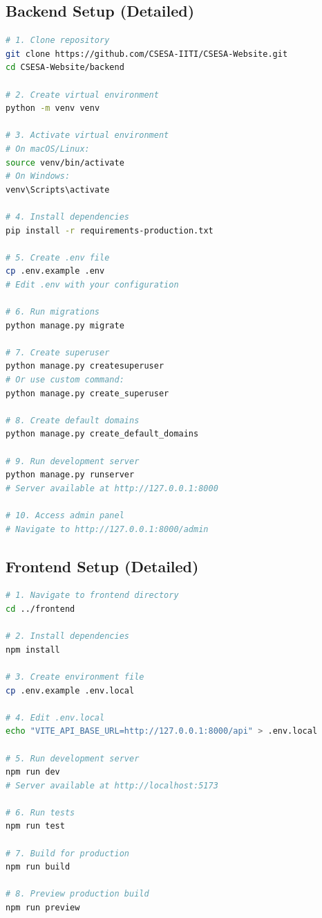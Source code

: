 \documentclass[11pt,a4paper]{article}
\begin{document}
\subsection{Backend Setup (Detailed)}
\begin{lstlisting}[language=bash]
# 1. Clone repository
git clone https://github.com/CSESA-IITI/CSESA-Website.git
cd CSESA-Website/backend

# 2. Create virtual environment
python -m venv venv

# 3. Activate virtual environment
# On macOS/Linux:
source venv/bin/activate
# On Windows:
venv\Scripts\activate

# 4. Install dependencies
pip install -r requirements-production.txt

# 5. Create .env file
cp .env.example .env
# Edit .env with your configuration

# 6. Run migrations
python manage.py migrate

# 7. Create superuser
python manage.py createsuperuser
# Or use custom command:
python manage.py create_superuser

# 8. Create default domains
python manage.py create_default_domains

# 9. Run development server
python manage.py runserver
# Server available at http://127.0.0.1:8000

# 10. Access admin panel
# Navigate to http://127.0.0.1:8000/admin
\end{lstlisting}


\subsection{Frontend Setup (Detailed)}
\begin{lstlisting}[language=bash]
# 1. Navigate to frontend directory
cd ../frontend

# 2. Install dependencies
npm install

# 3. Create environment file
cp .env.example .env.local

# 4. Edit .env.local
echo "VITE_API_BASE_URL=http://127.0.0.1:8000/api" > .env.local

# 5. Run development server
npm run dev
# Server available at http://localhost:5173

# 6. Run tests
npm run test

# 7. Build for production
npm run build

# 8. Preview production build
npm run preview
\end{lstlisting}
\end{document}
